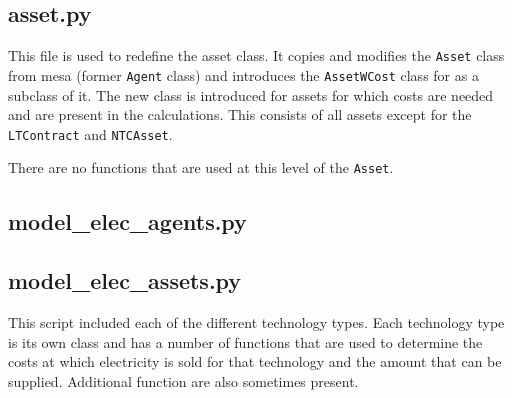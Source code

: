 
\subsection{asset.py}

This file is used to redefine the asset class. It copies and modifies the \texttt{Asset} class from mesa (former \texttt{Agent} class) and introduces the \texttt{AssetWCost} class for as a subclass of it. The new class is introduced for assets for which costs are needed and are present in the calculations. This consists of all assets except for the \texttt{LTContract} and \texttt{NTCAsset}.

There are no functions that are used at this level of the \texttt{Asset}.


\subsection{model\_elec\_agents.py}



\subsection{model\_elec\_assets.py}

This script included each of the different technology types. Each technology type is its own class and has a number of functions that are used to determine the costs at which electricity is sold for that technology and the amount that can be supplied. Additional function are also sometimes present.

